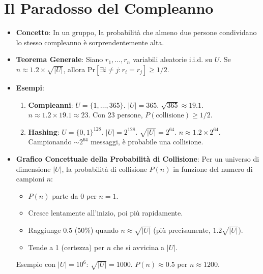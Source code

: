 \section{Il Paradosso del Compleanno}
\begin{itemize}
    \item \textbf{Concetto}: In un gruppo, la probabilità che almeno due persone condividano lo stesso compleanno è sorprendentemente alta.
    \item \textbf{Teorema Generale}: Siano $r_1, \dots, r_n$ variabili aleatorie i.i.d. su $U$.
    Se $n \approx 1.2 \times \sqrt{|U|}$, allora $\text{Pr}[\exists i \neq j : r_i = r_j] \ge 1/2$.
    \item \textbf{Esempi}:
    \begin{enumerate}
        \item \textbf{Compleanni}: $U = \{1, \dots, 365\}$. $|U|=365$. $\sqrt{365} \approx 19.1$. $n \approx 1.2 \times 19.1 \approx 23$. Con 23 persone, $P(\text{collisione}) \ge 1/2$.
        \item \textbf{Hashing}: $U = \{0,1\}^{128}$. $|U|=2^{128}$. $\sqrt{|U|} = 2^{64}$. $n \approx 1.2 \times 2^{64}$. Campionando $\sim 2^{64}$ messaggi, è probabile una collisione.
    \end{enumerate}
    \item \textbf{Grafico Concettuale della Probabilità di Collisione}:
    Per un universo di dimensione $|U|$, la probabilità di collisione $P(n)$ in funzione del numero di campioni $n$:
    \begin{itemize}
        \item $P(n)$ parte da 0 per $n=1$.
        \item Cresce lentamente all'inizio, poi più rapidamente.
        \item Raggiunge $0.5$ (50\%) quando $n \approx \sqrt{|U|}$ (più precisamente, $1.2 \sqrt{|U|}$).
        \item Tende a 1 (certezza) per $n$ che si avvicina a $|U|$.
    \end{itemize}
    Esempio con $|U|=10^6$: $\sqrt{|U|} = 1000$. $P(n) \approx 0.5$ per $n \approx 1200$.
    \begin{center}
\end{center}
\end{itemize}
